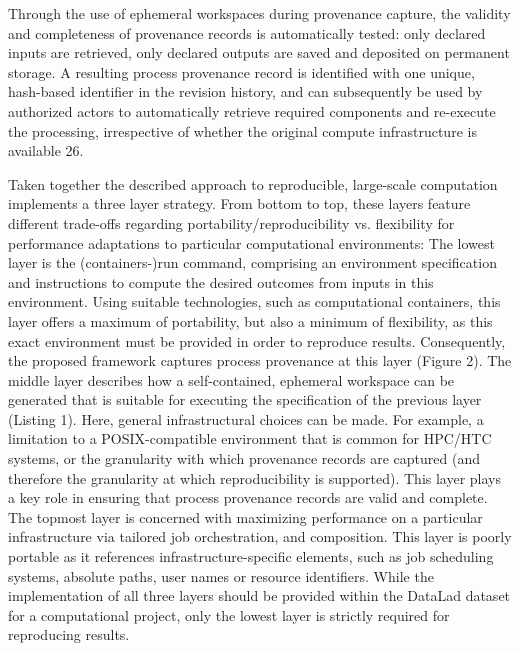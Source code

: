 Through the use of ephemeral workspaces during provenance capture, the validity and completeness of provenance records is automatically tested: only declared inputs are retrieved, only declared outputs are saved and deposited on permanent storage.
A resulting process provenance record is identified with one unique, hash-based identifier in the revision history, and can subsequently be used by authorized actors to automatically retrieve required components and re-execute the processing, irrespective of whether the original compute infrastructure is available 26.



Taken together the described approach to reproducible, large-scale computation implements a three layer strategy. From bottom to top, these layers feature different trade-offs regarding portability/reproducibility vs. flexibility for performance adaptations to particular computational environments: The lowest layer is the (containers-)run command, comprising an environment specification and instructions to compute the desired outcomes from inputs in this environment. Using suitable technologies, such as computational containers, this layer offers a maximum of portability, but also a minimum of flexibility, as this exact environment must be provided in order to reproduce results. Consequently, the proposed framework captures process provenance at this layer (Figure 2). The middle layer describes how a self-contained, ephemeral workspace can be generated that is suitable for executing the specification of the previous layer (Listing 1). Here, general infrastructural choices can be made. For example, a limitation to a POSIX-compatible environment that is common for HPC/HTC systems, or the granularity with which provenance records are captured (and therefore the granularity at which reproducibility is supported). This layer plays a key role in ensuring that process provenance records are valid and complete. The topmost layer is concerned with maximizing performance on a particular infrastructure via tailored job orchestration, and composition. This layer is poorly portable as it references infrastructure-specific elements, such as job scheduling systems, absolute paths, user names or resource identifiers. While the implementation of all three layers should be provided within the DataLad dataset for a computational project, only the lowest layer is strictly required for reproducing results.


